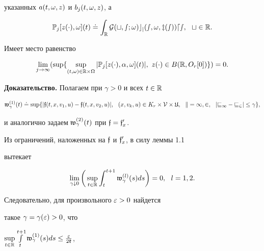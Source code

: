 указанных $a(t,\omega,z)$ и $b_{j}(t,\omega,z)$, а


$$


\Bbb P_{j}[z(\cdot),\om](t)\doteq\int_{\R}


\cal G(t,s;\om)c_{j}(s,\om,z(s))ds, \ \ t\in\R.


$$





\begin{lems}


Имеет место равенство


$$


\lim\lt_{j\to\infty}(\sup\{


\sup\lt_{(t,\om)\in\R\times\Om}|\Bbb P_{j}[z(\cdot),\alpha,\om](t)|,


\ z(\cdot)\in B(\R,O_{r}[0])\})=0.


$$


\end{lems}





{\bf Доказательство.} Полагаем при $\gamma>0$ и всех $t\in\Bbb R$


$$


\frak w_{\gamma}^{(1)}(t)\doteq\sup\{|\gf(t,x,v_{1},u)-\gf(t,x,v_{2},u)|,


\ \ (x,v_{k},u)\in K_{r}\times\cal V\times\frak U,


\ \ k=1,2,\ \ |v_{1}-v_{2}|\le\gamma\},


$$


и аналогично задаем $\frak w_{\gamma}^{(2)}(t)$ при $\frak f={\frak f}'_{x}$.


Из ограничений, наложенных на $\frak f$ и ${\frak f}'_{x}$, в силу леммы 1.1


вытекает


\begin{equation}


\lim_{\gamma\downto 0}\bigg(\sup\lt_{t\in\R}\int_{t}^{t+1}


\frak w_{\gamma}^{(l)}(s)ds\bigg)=0, \ \ l=1,2.


\end{equation}


Следовательно, для произвольного $\varepsilon>0$ найдется


такое $\gamma=\gamma(\varepsilon)>0$, что


$\sup\lt_{t\in\R}


\int\lt_{t}^{t+1}\frak w_{\gamma}^{(1)}(s)ds\le\frac{\ve}{2\frak k}$,


